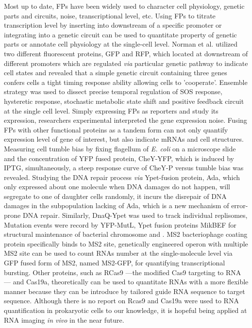 \documentclass[fleqn,10pt]{wlscirep}
\begin{document}
Most up to date, FPs have been widely used to character cell physiology, genetic parts and circuits, noise, transcriptional level, etc. Using FPs to titrate transcription level by inserting into downstream of a specific promoter or integrating into a genetic circuit can be used to quantitate property of genetic parts or annotate cell physiology at the single-cell level. Norman et al.\cite{Norman2013} utilized two different fluorescent proteins, GFP and RFP, which located at downstream of different promoters which are regulated \emph{via} particular genetic pathway to indicate cell states and revealed that a simple genetic circuit containing three genes confers cells a tight timing response ability allowing cells to 'cooperate'. Ensemble strategy was used to dissect precise temporal regulation of SOS response\cite{Friedman2005}, hysteretic response\cite{Ozbudak2004}, stochastic metabolic state shift\cite{Rosenthal2018} and positive feedback circuit\cite{Tan2009} at the single cell level. Simply expressing FPs as reporters and study its expression, researchers experimental interpreted the gene expression noise\cite{Elowitz2002, Ozbudak2004, Taniguchi2010}. Fusing FPs with other functional proteins as a tandem form can not only quantify expression level of gene of interest, but also indicate mRNAs and cell structures. Measuring cell tumble bias by fixing flagellum of \textit{E. coli} on a microscope slide and the concentration of YFP fused protein, CheY-YFP, which is induced by IPTG, simultaneously, a steep response curve of CheY-P versus tumble bias was revealed\cite{Cluzel2000}. Studying the DNA repair process \emph{via} Ypet-fusion protein, Ada, which only expressed about one molecule when DNA damages do not happen, will segregate to one of daughter cells randomly, it incurs the disrepair of DNA damages in the subpopulation lacking of Ada, which is a new mechanism of error-prone DNA repair. Similarly, DnaQ-Ypet was used to track individual replisomes\cite{Wallden2016}, Mutation events were record by YFP-MutL\cite{Wallden2016}, Ypet fusion proteins MikBEF for structural maintenance of bacterial chromosome\cite{Badrinarayanan2012} and . MS2 bacteriophage coating protein specifically binds to MS2 site, genetically engineered operon with multiple MS2 site can be used to count RNAs number at the single-molecule level via GFP fused form of MS2, named MS2-GFP\cite{Le2005}, for quantifying transcriptional bursting\cite{Golding2005}. Other proteins, such as RCas9\cite{OConnell2014} ---the modified Cas9 targeting to RNA --- and Cas19a\cite{Abudayyeh2017}, theoretically can be used to quantitate RNAs with a more flexible manner because they can be introduce by tailored guide RNA sequence to target sequence. Although there is no report on Rcas9 and Cas19a were used to RNA quantification in prokaryotic cells to our knowledge, it is hopeful being applied at RNA imaging \emph{in vivo} in the near future. 



\end{document}
